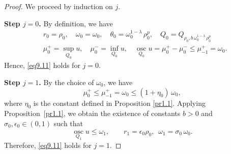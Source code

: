 \documentclass[a4paper,11pt,fullpage]{article}
\DeclareMathOperator*{\osc}{osc}
\numberwithin{equation}{section}
\begin{document}
\begin{proof}
We proceed by induction on $j$.

\medskip
\noindent\textbf{Step $j=0$.}
By definition, we have
\begin{equation*}
\begin{aligned}
&r_0=\rho_0,\quad \omega_0=\omega_0,\quad \theta_0=\omega^{1-\lambda}_0\,\rho^{p}_0,\quad Q_0=Q_{\rho_0, b\,\omega^{1-\lambda}_0\,\rho^{p}_0}
\\&\mu^+_0=\sup\limits_{Q_{0}}u,\quad \mu^-_0=\inf\limits_{Q_{0}} u,\quad \osc\limits_{Q_{0}} u=\mu^+_0-\mu^-_0\leqslant \mu^+_{-1}= \omega_0.
\end{aligned}
\end{equation*}
Hence, \eqref{eq9.11} holds for $j=0$.

\medskip
\noindent\textbf{Step $j=1$.}
By the choice of $\omega_0$, we have
\begin{equation}\label{eq9.12}
\mu^+_0\leqslant \mu^+_{-1} = \omega_0 \leqslant (1+\eta_0)\,\omega_0,
\end{equation}
where $\eta_0$ is the constant defined in Proposition \ref{pr1.1}. Applying Proposition~\ref{pr1.1}, we obtain the existence of constants $b>0$ and $\sigma_0,\epsilon_0\in(0,1)$ such that
\begin{equation}\label{eq9.13}
\osc\limits_{Q_{1}} u\leqslant \omega_1,\qquad r_1=\epsilon_0 \rho_0,\,\,\,\omega_1=\sigma_0\,\omega_0.
\end{equation}
Therefore, \eqref{eq9.11} holds for $j=1$.


\end{proof}
\end{document}
